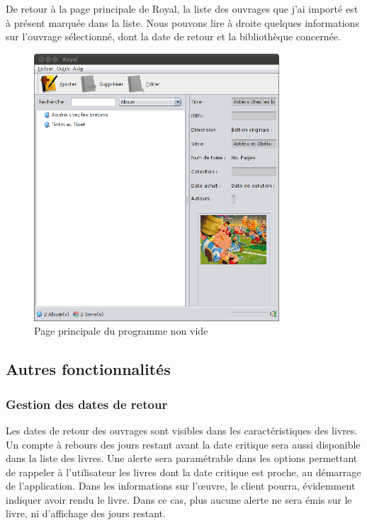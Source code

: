 De retour à la page principale de Royal, la liste des ouvrages que j'ai importé est à présent marquée dans la liste. 
Nous pouvons lire à droite quelques informations sur l'ouvrage sélectionné, dont la date de retour et la bibliothèque concernée. 

\begin{figure}[h]
\begin{center}
\includegraphics[height=10cm]{../img/principale.png}
\end{center}
\caption{Page principale du programme non vide}
\end{figure}

\subsection {Autres fonctionnalités}

\subsubsection {Gestion des dates de retour}
Les dates de retour des ouvrages sont visibles dans les caractéristiques des livres. 
Un compte à rebours des jours restant avant la date critique sera aussi disponible dans la liste des livres.
Une alerte sera paramétrable dans les options permettant de rappeler à l'utilisateur les livres dont la date critique est proche, au démarrage de l'application.
Dans les informations sur l'œuvre, le client pourra, évidemment indiquer avoir rendu le livre.
Dans ce cas, plus aucune alerte ne sera émis sur le livre, ni d'affichage des jours restant.

